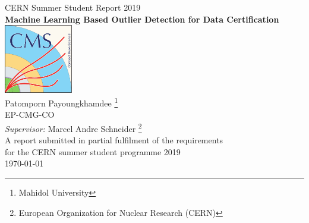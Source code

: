 \documentclass[11pt,oneside]{book}
\begin{document}

\frontmatter

\begin{titlepage}




\begin{center}
{\LARGE CERN Summer Student Report 2019}\\[1.5cm]
\linespread{1.2}\huge {\bfseries Machine Learning Based Outlier Detection for Data Certification}\\[1.5cm]
\linespread{1}
\includegraphics[width=3cm]{images/CMS_logo_May2014-eps-converted-to.pdf}\\[1cm]
{\Large Patomporn Payoungkhamdee \footnote{Mahidol University} \\ EP-CMG-CO}\\[1cm]
{\large \emph{Supervisor:} Marcel Andre Schneider \footnote{European Organization for Nuclear Research (CERN)}}\\[1cm] %
\large A report submitted in partial fulfilment of the requirements\\ for the CERN summer student programme 2019 \\[2cm] 
\today
\end{center}

\end{titlepage}



\end{document}
